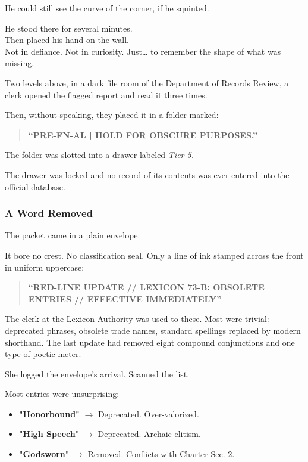 \documentclass[12pt]{article}
\begin{document}
He could still see the curve of the corner, if he squinted.

He stood there for several minutes.\\
Then placed his hand on the wall.\\
Not in defiance. Not in curiosity. Just… to remember the shape of what was missing.

\vspace{1em}

Two levels above, in a dark file room of the Department of Records Review, a clerk opened the flagged report and read it three times.

Then, without speaking, they placed it in a folder marked:

\begin{quote}
\textbf{“PRE-FN-AL \quad | \quad HOLD FOR OBSCURE PURPOSES.”}
\end{quote}

The folder was slotted into a drawer labeled \textit{Tier 5.}

The drawer was locked and no record of its contents was ever entered into the official database.


\dotfill

\subsubsection{A Word Removed}

The packet came in a plain envelope.

It bore no crest. No classification seal. Only a line of ink stamped across the front in uniform uppercase:

\begin{quote}
\textbf{“RED-LINE UPDATE // LEXICON 73-B: OBSOLETE ENTRIES // EFFECTIVE IMMEDIATELY”}
\end{quote}

The clerk at the Lexicon Authority was used to these. Most were trivial: deprecated phrases, obsolete trade names, standard spellings replaced by modern shorthand. The last update had removed eight compound conjunctions and one type of poetic meter.

She logged the envelope’s arrival. Scanned the list.

Most entries were unsurprising:
\begin{itemize}
    \item \textbf{"Honorbound"} $\rightarrow$ Deprecated. Over-valorized.
    \item \textbf{"High Speech"} $\rightarrow$ Deprecated. Archaic elitism.
    \item \textbf{"Godsworn"} $\rightarrow$ Removed. Conflicts with Charter Sec. 2.
\end{itemize}
\end{document}
